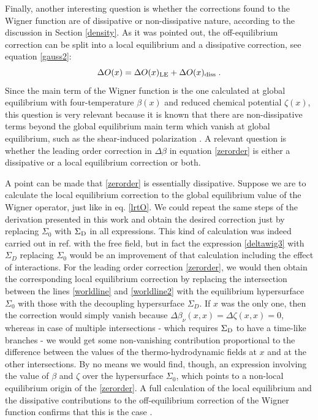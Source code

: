 \documentclass[prd,superscriptaddress,nofootinbib,notitlepage]{revtex4-1}
\begin{document}
Finally, another interesting question is whether the corrections found to the Wigner function are of dissipative or 
non-dissipative nature, according to the discussion in Section \ref{density}. As it was pointed out, the 
off-equilibrium correction can be split into a local equilibrium and a dissipative correction, see equation 
\eqref{gauss2}:
%
$$
 \Delta O(x) = \Delta O(x)_{\rm LE} + \Delta O(x)_{\rm diss}\;.
$$
%
Since the main term of the Wigner function is the one calculated at global equilibrium with four-temperature $\beta(x)$
and reduced chemical potential $\zeta(x)$, this question is very relevant because it is known that there are non-dissipative 
terms beyond the global equilibrium main term which vanish at global equilibrium, such as the shear-induced polarization 
\cite{Becattini:2021suc,Liu:2021uhn}. A relevant question is whether the leading order correction in $\Delta\beta$ in
equation \eqref{zerorder} is either a dissipative or a local equilibrium correction or both.

A point can be made that \eqref{zerorder} is essentially dissipative. Suppose we are to calculate the local equilibrium 
correction to the global equilibrium value of the Wigner operator, 
just like in eq. \eqref{lrtO}. We could repeat the same steps of the derivation presented in this work and obtain
the desired correction just by replacing $\Sigma_0$ with $\Sigma_{\rm D}$ in all expressions. This kind of 
calculation was indeed carried out in ref. \cite{Sheng:2025cjk} with the free field, but in fact the expression 
\eqref{deltawig3} with $\Sigma_D$ replacing $\Sigma_0$ would be an improvement of that calculation including the 
effect of interactions. For the leading order correction \eqref{zerorder}, we would then obtain the corresponding local 
equilibrium correction by replacing the intersection between the lines \eqref{worldline} and \eqref{worldline2} with the 
equilibrium hypersurface $\Sigma_0$ with those with the decoupling hypersurface $\Sigma_D$. If $x$ was the only one, then 
the correction would simply vanish because $\Delta \beta_\nu (x,x) = \Delta \zeta(x,x)=0$, whereas in case of multiple 
intersections - which 
requires $\Sigma_{\rm D}$ to have a time-like branches - we would get some non-vanishing contribution proportional to 
the difference between the values of the thermo-hydrodynamic fields at $x$ and at the other intersections. By no
means we would find, though, an expression involving the value of $\beta$ and $\zeta$ over the hypersurface $\Sigma_0$,
which points to a non-local equilibrium origin of the \eqref{zerorder}. A full calculation of the local equilibrium
and the dissipative contributions to the off-equilibrium correction of the Wigner function confirms that this is the 
case \cite{roselliphd}.
\end{document}
